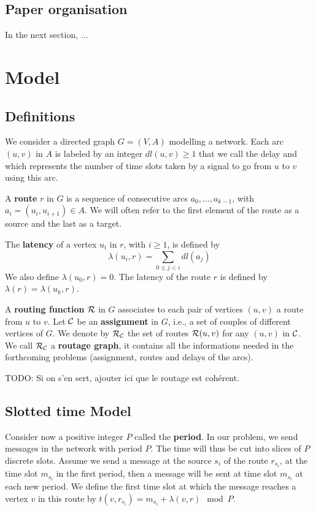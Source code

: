 \documentclass[a4paper,10pt]{article}
\newcommand{\todo}[1]{{\color{red} TODO: {#1}}}
\begin{document}
\subsection*{Paper organisation}
 In the next section, ...


  

\section{Model}

  \subsection{Definitions}
  

  
	We consider a directed graph $G=(V,A)$ modelling a network. Each arc  $(u,v)$ in $A$ is labeled by an integer $dl(u,v) \geq 1$ that we call the delay and
	which represents the number of time slots taken by a signal to go from $u$ to $v$ using this arc. 
	
      A {\bf route} $r$ in $G$ is a sequence of consecutive arcs $a_0, \ldots , a_{k-1}$, with $a_i=(u_i,u_{i+1}) \in A$. 
      We will often refer to the first element of the route as a source and the last as a target.
      
      The {\bf latency} of a vertex $u_i$ in $r$, with $i \geq 1$, is defined by $$\lambda(u_i,r)= \sum\limits_{0 \leq j <i} dl(a_j)$$ We also define $\lambda(u_0,r)=0$.
      The latency of the route $r$ is defined by $\lambda (r)= \lambda (u_k,r)$.
      

      A {\bf routing function} $\cal R$ in $G$ associates to each pair of vertices $(u,v)$ a route from $u$ to $v$. Let $\cal C$ be an {\bf assignment} in $G$, i.e., a set of couples of different vertices of $G$. We denote by $\cal R_{\cal C}$ the set of routes ${\cal R}(u,v)$ for any $(u,v)$ in $\cal C$. We call $\cal R_{\cal C}$ a {\bf routage graph}, it contains all the informations needed in the forthcoming problems (assignment, routes and delays of the arcs). 
      

      \todo{Si on s'en sert, ajouter ici que le routage est cohérent.}

   \subsection{Slotted time Model}
      Consider now a positive integer $P$ called the {\bf period}. In our problem, we send messages in the network with period $P$. The time will thus be cut into slices of $P$ discrete slots. Assume we send a message at the source $s_i$ of the route $r_{s_i}$, at the time slot $m_{s_i}$ in the first period, then a message will be sent at time slot $m_{s_i}$ at each new period. We define the first time slot at which the message reaches a vertex $v$ in this route by $t(v,r_{s_i}) = m_{s_i} + \lambda(v,r) \mod P$. 
\end{document}

